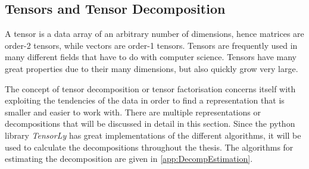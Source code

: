 \subsection{Tensors and Tensor Decomposition}\label{tex:decomp_methods}
A tensor is a data array of an arbitrary number of dimensions, hence matrices are order-2 tensors, while vectors are order-1 tensors. Tensors are frequently used in many different fields that have to do with computer science\cite{Mørup2011}. Tensors have many great properties due to their many dimensions, but also quickly grow very large.

The concept of tensor decomposition or tensor factorisation concerns itself with exploiting the tendencies of the data in order to find a representation that is smaller and easier to work with. There are multiple representations or decompositions that will be discussed in detail in this section. Since the python library \textit{TensorLy} has great implementations of the different algorithms, it will be used to calculate the decompositions throughout the thesis. The algorithms for estimating the decomposition are given in \autoref{app:DecompEstimation}. 

